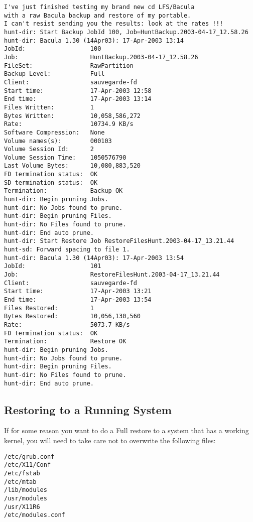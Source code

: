\footnotesize
\begin{verbatim}
I've just finished testing my brand new cd LFS/Bacula
with a raw Bacula backup and restore of my portable.
I can't resist sending you the results: look at the rates !!!
hunt-dir: Start Backup JobId 100, Job=HuntBackup.2003-04-17_12.58.26
hunt-dir: Bacula 1.30 (14Apr03): 17-Apr-2003 13:14
JobId:                  100
Job:                    HuntBackup.2003-04-17_12.58.26
FileSet:                RawPartition
Backup Level:           Full
Client:                 sauvegarde-fd
Start time:             17-Apr-2003 12:58
End time:               17-Apr-2003 13:14
Files Written:          1
Bytes Written:          10,058,586,272
Rate:                   10734.9 KB/s
Software Compression:   None
Volume names(s):        000103
Volume Session Id:      2
Volume Session Time:    1050576790
Last Volume Bytes:      10,080,883,520
FD termination status:  OK
SD termination status:  OK
Termination:            Backup OK
hunt-dir: Begin pruning Jobs.
hunt-dir: No Jobs found to prune.
hunt-dir: Begin pruning Files.
hunt-dir: No Files found to prune.
hunt-dir: End auto prune.
hunt-dir: Start Restore Job RestoreFilesHunt.2003-04-17_13.21.44
hunt-sd: Forward spacing to file 1.
hunt-dir: Bacula 1.30 (14Apr03): 17-Apr-2003 13:54
JobId:                  101
Job:                    RestoreFilesHunt.2003-04-17_13.21.44
Client:                 sauvegarde-fd
Start time:             17-Apr-2003 13:21
End time:               17-Apr-2003 13:54
Files Restored:         1
Bytes Restored:         10,056,130,560
Rate:                   5073.7 KB/s
FD termination status:  OK
Termination:            Restore OK
hunt-dir: Begin pruning Jobs.
hunt-dir: No Jobs found to prune.
hunt-dir: Begin pruning Files.
hunt-dir: No Files found to prune.
hunt-dir: End auto prune.
\end{verbatim}
\normalsize

\label{running}

\subsection*{Restoring to a Running System}

If for some reason you want to do a Full restore to a system that has a
working kernel, you will need to take care not to overwrite the following
files: 

\footnotesize
\begin{verbatim}
/etc/grub.conf
/etc/X11/Conf
/etc/fstab
/etc/mtab
/lib/modules
/usr/modules
/usr/X11R6
/etc/modules.conf
\end{verbatim}
\normalsize

